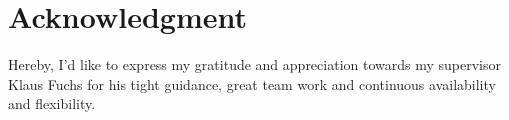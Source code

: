 \chapter*{Acknowledgment}
Hereby, I'd like to express my gratitude and appreciation towards my supervisor Klaus Fuchs for his tight guidance, great team work and continuous availability and flexibility.